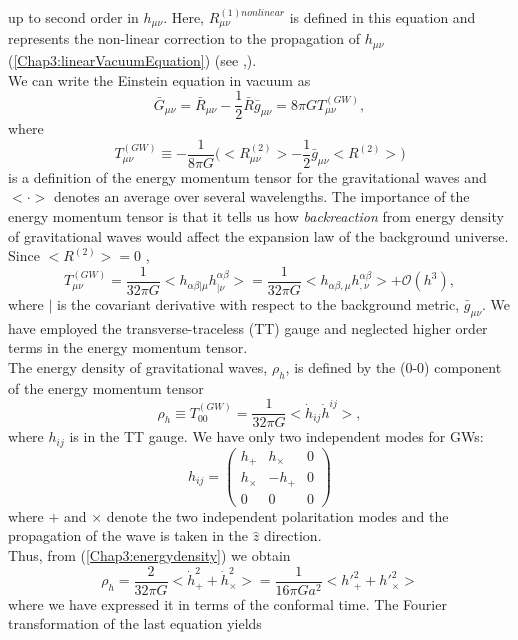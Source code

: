 \documentclass[11pt,a4paper,twoside]{book}
\begin{document}
up to second order in $ h_{\mu\nu} $. Here, $ R_{\mu\nu}^{(1)nonlinear}  $ is defined in this equation and represents the non-linear correction to the propagation of $ h_{\mu\nu} $ (\ref{Chap3:linearVacuumEquation}) (see \cite{Chap3:GW_Watanabe_Komatsu},\cite{Chap3: Gravitation}).\\
We can write the Einstein equation in vacuum as
\begin{equation}
\label{Chap3:RGEquation}
\bar{G}_{\mu\nu} = \bar{R}_{\mu\nu} - \frac{1}{2}\bar{R}\bar{g}_{\mu\nu} = 8\pi G T_{\mu\nu}^{(GW)},
\end{equation}
where
\begin{equation}
	\label{Chap3:TGWEquation}
	T_{\mu\nu}^{(GW)} \equiv -\frac{1}{8\pi G}\Big (<R^{(2)}_{\mu\nu}> - \frac{1}{2}\bar{g}_{\mu\nu}<R^{(2)}>\Big)
\end{equation}
is a definition of the energy momentum tensor for the gravitational waves and $ <\cdot> $ denotes an average over several wavelengths. The importance of the energy momentum tensor is that it tells us how \textit{backreaction} from energy density of gravitational waves would affect the expansion law of the background universe. Since $ <R^{(2)}> = 0 $ \cite{Chap3: Gravitation},
\begin{equation}
	\label{Chap3:TGW2}
	T_{\mu\nu}^{(GW)} = \frac{1}{32\pi G}<h_{\alpha\beta|\mu}h^{\alpha\beta}_{|\nu}> = \frac{1}{32\pi G} <h_{\alpha\beta,\mu} h^{\alpha\beta}_{,\nu}> + \mathcal{O}(h^{3}),
\end{equation}
where $ | $ is the covariant derivative with respect to the background metric, $\bar{g}_{\mu\nu} $. We have employed the transverse-traceless (TT) gauge and neglected higher order terms in the energy momentum tensor.\\
The energy density of gravitational waves, $ \rho_{h} $, is defined by the (0-0) component of the energy momentum tensor
\begin{equation}
	\label{Chap3:energydensity}
	\rho_{h} \equiv T_{00}^{(GW)} = \frac{1}{32\pi G} <\dot{h}_{ij}\dot{h}^{ij}>,
\end{equation}
where $ h_{ij} $ is in the TT gauge. We have only two independent modes for GWs:
\begin{equation}
	\label{Chap3:GWMatrix}
	h_{ij} = \left(
	\begin{array}{ccc}
		h_{+} & h_{\times} & 0 \\
		h_{\times} &- h_{+} & 0 \\
		0 & 0 & 0
	\end{array}
	\right)
\end{equation}
where $ + $ and $ \times $ denote the two independent polaritation modes and the propagation of the wave is taken in the $ \hat{z} $ direction.\\
Thus, from (\ref{Chap3:energydensity}) we obtain
\begin{equation}
	\label{Chap3:energydensity2}
	\rho_{h} = \frac{2}{32\pi G}<\dot{h}^{2}_{+} + \dot{h}^{2}_{\times}> = \frac{1}{16\pi G a^{2}}<h'^{2}_{+} + h'^{2}_{\times}> 
\end{equation}
where we have expressed it in terms of the conformal time. The Fourier transformation of the last equation yields
\end{document}
